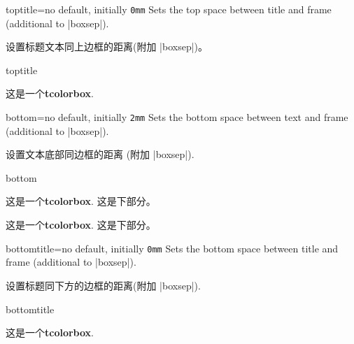 \begin{docTcbKey}{toptitle}{=}{no default, initially \texttt{0mm}}
  Sets the top space between title and frame (additional to |boxsep|).

设置标题文本同上边框的距离(附加 |boxsep|)。    
\begin{exdispExample}{toptitle}

\begin{tcolorbox}[toptitle=3mm,title=My title]
这是一个\textbf{tcolorbox}.
\end{tcolorbox}
\end{exdispExample}
\end{docTcbKey}






\begin{docTcbKey}{bottom}{=}{no default, initially \texttt{2mm}}
  Sets the bottom space between text and frame (additional to |boxsep|).

设置文本底部同边框的距离 (附加 |boxsep|).
\begin{exdispExample}{bottom}

\begin{tcolorbox}[bottom=0mm]
这是一个\textbf{tcolorbox}.
\tcblower
这是下部分。
\end{tcolorbox}
\begin{tcolorbox}
  这是一个\textbf{tcolorbox}.
  \tcblower
  这是下部分。
  \end{tcolorbox}
\end{exdispExample}
\end{docTcbKey}

\begin{docTcbKey}{bottomtitle}{=}{no default, initially \texttt{0mm}}
  Sets the bottom space between title and frame (additional to |boxsep|).

设置标题同下方的边框的距离(附加 |boxsep|).
\begin{exdispExample}{bottomtitle}

\begin{tcolorbox}[bottomtitle=3mm,title=My title]
这是一个\textbf{tcolorbox}.
\end{tcolorbox}
\end{exdispExample}
\end{docTcbKey}


